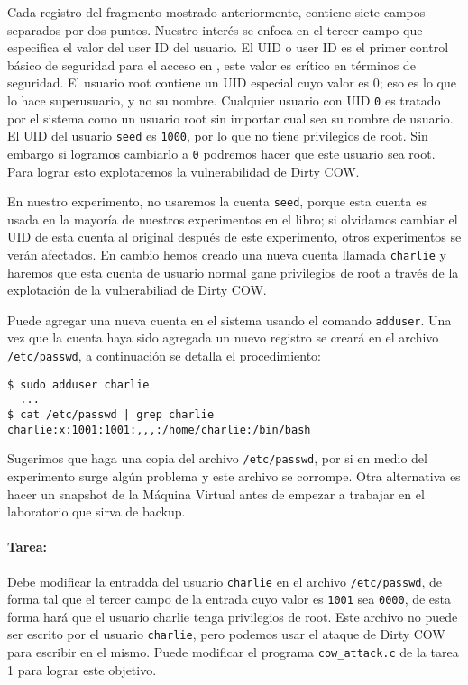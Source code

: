 Cada registro del fragmento mostrado anteriormente, contiene siete campos separados por dos puntos. Nuestro interés se enfoca en el tercer campo que especifica el valor del user ID del usuario. El UID o user ID es el primer control básico de seguridad para el acceso en \linux, este valor es crítico en términos de seguridad.
El usuario root contiene un UID especial cuyo valor es 0; eso es lo que lo hace superusuario, y no su nombre. Cualquier usuario con UID \texttt{0} es tratado por el sistema como un usuario root sin importar cual sea su nombre de usuario.
El UID del usuario \texttt{seed} es \texttt{1000}, por lo que no tiene privilegios de root. Sin embargo si logramos cambiarlo a \texttt{0} podremos hacer que este usuario sea root. Para lograr esto explotaremos la vulnerabilidad de Dirty COW.

En nuestro experimento, no usaremos la cuenta \texttt{seed}, porque esta cuenta es usada en la mayoría de nuestros experimentos en el libro; si olvidamos cambiar el UID de esta cuenta al original después de este experimento, otros experimentos se verán afectados. En cambio hemos creado una nueva cuenta llamada \texttt{charlie} y haremos que esta cuenta de usuario normal gane privilegios de root a través de la explotación de la vulnerabiliad de Dirty COW.

Puede agregar una nueva cuenta en el sistema usando el comando  \texttt{adduser}.
Una vez que la cuenta haya sido agregada un nuevo registro se creará en el archivo  \texttt{/etc/passwd}, a continuación se detalla el procedimiento:


\begin{lstlisting}
$ sudo adduser charlie
  ...
$ cat /etc/passwd | grep charlie
charlie:x:1001:1001:,,,:/home/charlie:/bin/bash
\end{lstlisting}

Sugerimos que haga una copia del archivo \texttt{/etc/passwd}, por si en medio del experimento surge algún problema y este archivo se corrompe. Otra alternativa es hacer un snapshot de la Máquina Virtual antes de empezar a trabajar en el laboratorio que sirva de backup.


\paragraph{Tarea:} Debe modificar la entradda del usuario \texttt{charlie} en el archivo \texttt{/etc/passwd}, de forma tal que el tercer campo de la entrada cuyo valor es \texttt{1001} sea \texttt{0000}, de esta forma hará que el usuario charlie tenga privilegios de root.
Este archivo no puede ser escrito por el usuario \texttt{charlie}, pero podemos usar el ataque de Dirty COW para escribir en el mismo. Puede modificar el programa 
\texttt{cow\_attack.c} de la tarea 1 para lograr este objetivo.

